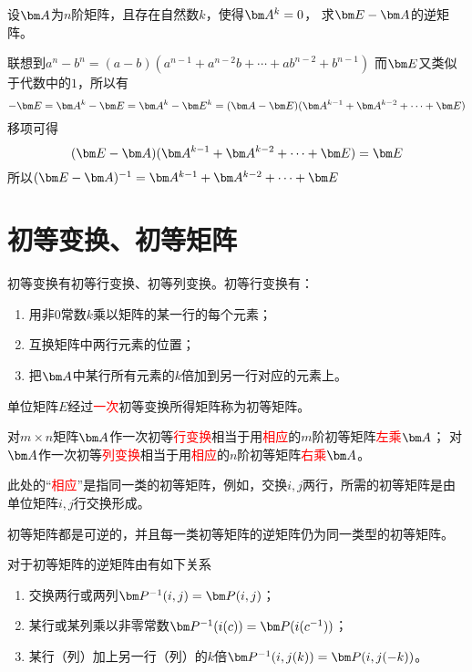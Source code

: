 \begin{example}
    设$\mat{A}$为$n$阶矩阵，且存在自然数$k$，使得$\mat{A}^k=0$，
    求$\mat{E}-\mat{A}$的逆矩阵。
\end{example}
\begin{solution}
    联想到$a^n-b^n=(a-b)(a^{n-1} + a^{n-2}b + \cdots + ab^{n-2} + b^{n-1})$
    而$\mat{E}$又类似于代数中的$1$，所以有
    \[ -\mat{E} = \mat{A}^k - \mat{E} = \mat{A}^k - \mat{E}^k = (\mat{A}-\mat{E})(\mat{A}^{k-1} + \mat{A}^{k-2} + \cdots + \mat{E}) \]
    移项可得
    \[ (\mat{E}-\mat{A})(\mat{A}^{k-1} + \mat{A}^{k-2} + \cdots + \mat{E}) = \mat{E} \]
    所以$(\mat{E}-\mat{A})^{-1}= \mat{A}^{k-1} + \mat{A}^{k-2} + \cdots + \mat{E}$
\end{solution}

\section{初等变换、初等矩阵}
初等变换有初等行变换、初等列变换。初等行变换有：
\begin{enumerate}[(1)]
    \item 用非$0$常数$k$乘以矩阵的某一行的每个元素；
    \item 互换矩阵中两行元素的位置；
    \item 把$\mat{A}$中某行所有元素的$k$倍加到另一行对应的元素上。
\end{enumerate}
\begin{definition}
    单位矩阵$E$经过\textcolor{red}{一次}初等变换所得矩阵称为初等矩阵。
\end{definition}
\begin{theorem}
    对$m\times n$矩阵$\mat{A}$作一次初等\textcolor{red}{行变换}相当于用\textcolor{red}{相应}的$m$阶初等矩阵\textcolor{red}{左乘}$\mat{A}$；
    对$\mat{A}$作一次初等\textcolor{red}{列变换}相当于用\textcolor{red}{相应}的$n$阶初等矩阵\textcolor{red}{右乘}$\mat{A}$。
\end{theorem}
此处的“\textcolor{red}{相应}”是指同一类的初等矩阵，例如，交换$i,j$两行，所需的初等矩阵是由单位矩阵$i,j$行交换形成。
\begin{theorem}
    初等矩阵都是可逆的，并且每一类初等矩阵的逆矩阵仍为同一类型的初等矩阵。
\end{theorem}
对于初等矩阵的逆矩阵由有如下关系
\begin{enumerate}[(1)]
    \item 交换两行或两列$\mat{P}^{-1}(i,j) = \mat{P}(i,j)$；
    \item 某行或某列乘以非零常数$\mat{P}^{-1}(i(c)) = \mat{P}(i(c^{-1}))$；
    \item 某行（列）加上另一行（列）的$k$倍$\mat{P}^{-1}(i,j(k)) = \mat{P}(i,j(-k))$。
\end{enumerate}

